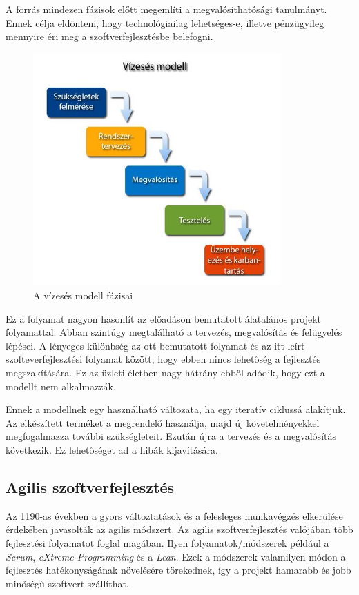 \documentclass[a4paper,12pt,leqno, notitlepage]{article}%
\begin{document}
A \cite{waterfall} forrás mindezen fázisok előtt megemlíti a megvalósíthatósági tanulmányt. Ennek célja eldönteni, hogy technológiailag lehetséges-e, illetve pénzügyileg mennyire éri meg a szoftverfejlesztésbe belefogni.

\begin{figure}[htb]
	\centering
		\includegraphics[width=0.85\textwidth]{images/waterfall.jpg}
	\caption{A vízesés modell fázisai \cite{waterfall_image}}
	\label{fig:waterfall}
\end{figure}

Ez a folyamat nagyon hasonlít az előadáson bemutatott álatalános projekt folyamattal. Abban szintúgy megtalálható a tervezés, megvalósítás és felügyelés lépései. A lényeges különbség az ott bemutatott folyamat és az itt leírt szofteverfejlesztési folyamat között, hogy ebben nincs lehetőség a fejlesztés megszakítására. Ez az üzleti életben nagy hátrány ebből adódik, hogy ezt a modellt nem alkalmazzák.

Ennek a modellnek egy használható változata, ha egy iteratív ciklussá alakítjuk. Az elkészített terméket a megrendelő használja, majd új követelményekkel megfogalmazza további szükségleteit. Ezután újra  a tervezés és  a megvalósítás következik. Ez lehetőséget ad a hibák kijavítására.


\subsection{Agilis szoftver\-fejlesztés}

Az 1190-as években a gyors változtatások és a felesleges munkavégzés elkerülése érdekében javasolták az agilis módszert. Az agilis szoftver\-fejlesztés valójában több fejlesztési folyamatot foglal magában. Ilyen folyamatok/módszerek például a \emph{Scrum}, \emph{eXtreme Programming} és a \emph{Lean}.\cite{agile} Ezek a módszerek valamilyen módon a fejlesztés hatékonyságának növelésére törekednek, így a projekt hamarabb és jobb minőségű szoftvert szállíthat.
\end{document}
